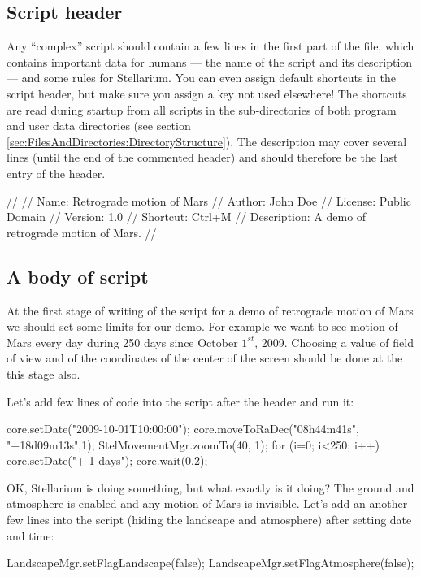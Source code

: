 \subsection{Script header}
Any ``complex'' script should contain a few lines in the first part of
the file, which contains important data for humans --- the name of the
script and its description --- and some rules for Stellarium. You can
even assign default shortcuts in the script header, but make sure you
assign a key not used elsewhere! The shortcuts are read during startup
from all scripts in the  sub-directories of both program
and user data directories (see section
\ref{sec:FilesAndDirectories:DirectoryStructure}).  The description
may cover several lines (until the end of the commented header) and
should therefore be the last entry of the header.

\begin{script}
//
// Name: Retrograde motion of Mars
// Author: John Doe
// License: Public Domain
// Version: 1.0
// Shortcut: Ctrl+M
// Description: A demo of retrograde motion of Mars.
//
\end{script}

\subsection{A body of script}
At the first stage of writing of the script for a demo of 
retrograde motion of Mars we should set some limits for 
our demo. For example we want to see motion of Mars every 
day during 250 days since October $1^{st}$,  2009. 
Choosing a value of field of view and of the coordinates 
of the center of the screen should be done at the this 
stage also. 

Let's add few lines of code into the script after the header 
and run it:
\begin{script}
core.setDate("2009-10-01T10:00:00");
core.moveToRaDec("08h44m41s", "+18d09m13s",1);
StelMovementMgr.zoomTo(40, 1);
for (i=0; i<250; i++)
{
      core.setDate("+ 1 days");
      core.wait(0.2);
}
\end{script}

OK, Stellarium is doing something, but what exactly is it
doing? The ground and atmosphere is enabled and any 
motion of Mars is invisible. Let's add an another few 
lines into the script (hiding the landscape and atmosphere) 
after setting date and time:

\begin{script}
LandscapeMgr.setFlagLandscape(false);
LandscapeMgr.setFlagAtmosphere(false);
\end{script}

